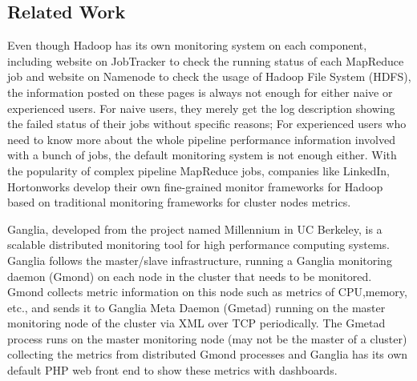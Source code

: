 \subsection{Related Work}
Even though Hadoop has its own monitoring system on each component, including website on JobTracker to check the running status of each MapReduce job and website on Namenode to check the usage of Hadoop File System (HDFS), the information posted on these pages is always not enough for either naive or experienced users.
For naive users, they merely get the log description showing the failed status of their jobs without specific reasons; For experienced users who need to know more about the whole pipeline performance information involved with a bunch of jobs, the default monitoring system is not enough either.
With the popularity of complex pipeline MapReduce jobs, companies like LinkedIn, Hortonworks develop their own fine-grained monitor frameworks for Hadoop based on traditional monitoring frameworks for cluster nodes metrics.\par
Ganglia\cite{massie2004ganglia}, developed from the project named Millennium in UC Berkeley, is a scalable distributed monitoring tool for high performance computing systems.
Ganglia follows the master/slave infrastructure, running a Ganglia monitoring daemon (Gmond) on each node in the cluster that needs to be monitored.
Gmond collects metric information on this node such as metrics of CPU,memory, etc., and sends it to Ganglia Meta Daemon (Gmetad) running on the master monitoring node of the cluster via XML over TCP periodically.
The Gmetad process runs on the master monitoring node (may not be the master of a cluster) collecting the metrics from distributed Gmond processes and Ganglia has its own default PHP web front end to show these metrics with dashboards.


